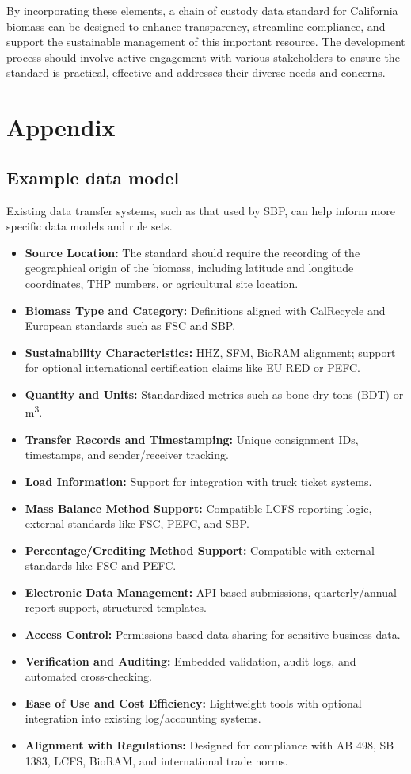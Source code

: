 \documentclass{article}
\begin{document}
By incorporating these elements, a chain of custody data standard for California biomass can be designed to enhance transparency, streamline compliance, and support the sustainable management of this important resource. The development process should involve active engagement with various stakeholders to ensure the standard is practical, effective and addresses their diverse needs and concerns.




\section{Appendix}


\subsection{Example data model}
Existing data transfer systems, such as that used by SBP, can help inform more specific data models and rule sets. 
\begin{itemize}
    \item \textbf{Source Location:} The standard should require the recording of the geographical origin of the biomass, including latitude and longitude coordinates, THP numbers, or agricultural site location.
    \item \textbf{Biomass Type and Category:} Definitions aligned with CalRecycle and European standards such as FSC and SBP.
    \item \textbf{Sustainability Characteristics:} HHZ, SFM, BioRAM alignment; support for optional international certification claims like EU RED or PEFC.
    \item \textbf{Quantity and Units:} Standardized metrics such as bone dry tons (BDT) or m\textsuperscript{3}.
    \item \textbf{Transfer Records and Timestamping:} Unique consignment IDs, timestamps, and sender/receiver tracking.
    \item \textbf{Load Information:} Support for integration with truck ticket systems.
    \item \textbf{Mass Balance Method Support:} Compatible LCFS reporting logic, external standards like FSC, PEFC, and SBP.
    \item \textbf {Percentage/Crediting Method Support:} Compatible with external standards like FSC and PEFC.
    \item \textbf{Electronic Data Management:} API-based submissions, quarterly/annual report support, structured templates.
    \item \textbf{Access Control:} Permissions-based data sharing for sensitive business data.
    \item \textbf{Verification and Auditing:} Embedded validation, audit logs, and automated cross-checking.
    \item \textbf{Ease of Use and Cost Efficiency:} Lightweight tools with optional integration into existing log/accounting systems.
    \item \textbf{Alignment with Regulations:} Designed for compliance with AB 498, SB 1383, LCFS, BioRAM, and international trade norms.
\end{itemize}
\end{document}

